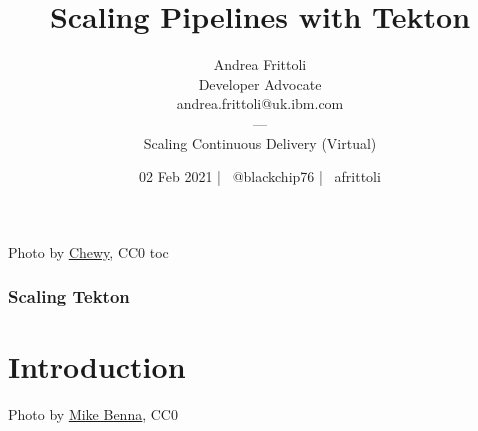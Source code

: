 \documentclass[aspectratio=169,11pt,hyperref={colorlinks=true}]{beamer}
\title{Scaling Pipelines with Tekton}
\date[02 Feb 2021]{02 Feb 2021 | \faTwitter ~@blackchip76 | \faGithub ~afrittoli}
\author[Andrea Frittoli]{
  Andrea Frittoli \\
  Developer Advocate \\
  andrea.frittoli@uk.ibm.com \\
  --- \\
  Scaling Continuous Delivery (Virtual)
}
\begin{document}
\begin{frame}
\titlepage{}
\end{frame}

\begin{lpicrblack}{%
  Photo by \href{https://unsplash.com/@chewy}{\underline{Chewy}}, CC0
  }%
  {%
  \tableofcontents
  }%
  {toc}
  \frametitle{Scaling Tekton}
\end{lpicrblack}

\section[Introduction]{Introduction}

\begin{sectionwithpic}{Photo by \href{https://unsplash.com/@mbenna}{\underline{Mike Benna}}, CC0}
\end{sectionwithpic}
\end{document}
